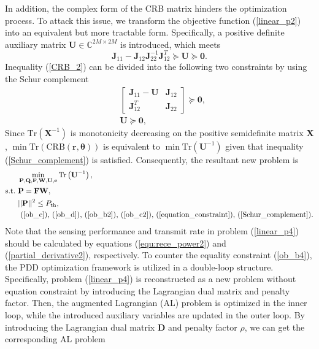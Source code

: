 \documentclass[10pt,journal,twocolumn]{IEEEtran}
\begin{document}
In addition, the complex form of the CRB matrix hinders the optimization process. To attack this issue, we transform the objective function (\ref{linear_p2}) into an equivalent but more tractable form. Specifically, a positive definite auxiliary matrix $\mathbf{U}\in\mathbb{C}^{2M\times 2M}$ is introduced, which meets
\begin{equation}
\mathbf{J}_{11}-\mathbf{J}_{12}\mathbf{J}^{-1}_{22}\mathbf{J}^T_{12}\succeq \mathbf{U}\succeq\mathbf{0}.\label{CRB_2}
\end{equation}
Inequality (\ref{CRB_2}) can be divided into the following two constraints by using the Schur complement
\begin{subequations}\label{Schur_complement}
\begin{align}
&\begin{bmatrix} \mathbf{J}_{11}-\mathbf{U} & \mathbf{J}_{12} \\ \mathbf{J}^T_{12} & \mathbf{J}_{22} \end{bmatrix}\succeq\mathbf{0},\label{Schur_1}\\
 & \mathbf{U}\succeq\mathbf{0},\label{Schur_2}
\end{align}
\end{subequations}
Since $\text{Tr}\left(\mathbf{X}^{-1}\right)$ is monotonicity decreasing on the positive semidefinite matrix $\mathbf{X}$, $\min \text{Tr}\left(\text{CRB}\left(\mathbf{r},\bm{\theta}\right)\right)$ is equivalent to $\min \text{Tr}\left(\mathbf{U}^{-1}\right)$ given that inequality (\ref{Schur_complement}) is satisfied. Consequently, the resultant new problem is
\begin{subequations}\label{linear_p4}
	\begin{align}
&\min_{\mathbf{P},\mathbf{Q},\mathbf{F},\mathbf{W},\mathbf{U},\mathbf{c} } \text{Tr}\left(\mathbf{U}^{-1}\right),\label{ob_a4}\\
	\text{s.t.}~
	&\mathbf{P}=\mathbf{F}\mathbf{W},\label{ob_b4}\\
 &||\mathbf{P}||^2\leq P_{\text{th}},\label{ob_c4}\\
  &\mbox{ (\ref{ob_c}),~(\ref{ob_d}),~(\ref{ob_b2}),~(\ref{ob_c2}),~(\ref{equation_constraint}),~(\ref{Schur_complement})}.\label{ob_d4}
	\end{align}
\end{subequations}
Note that the sensing performance and transmit rate in problem (\ref{linear_p4}) should be calculated by equations (\ref{equ:rece_power2}) and (\ref{partial_derivative2}), respectively. To counter the equality constraint (\ref{ob_b4}), the PDD optimization framework is utilized in a double-loop structure. Specifically, problem (\ref{linear_p4}) is reconstructed as a new problem without equation constraint by introducing the Lagrangian dual matrix and penalty factor. Then, the augmented Lagrangian (AL) problem is optimized in the inner loop, while the introduced auxiliary variables are updated in the outer loop. By introducing the Lagrangian dual matrix $\mathbf{D}$ and penalty factor $\rho$, we can get the corresponding AL problem
\end{document}
